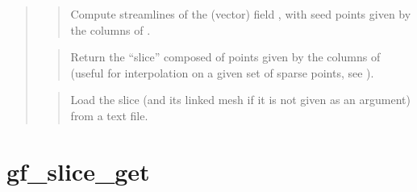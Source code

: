 \documentclass[a4paper,11pt,english]{sphinxmanual}
\begin{document}
\begin{quote}
\begin{quote}
Compute streamlines of the (vector) field , with seed points given
by the columns of .
\end{quote}

\begin{quote}

Return the “slice” composed of points given by the columns of 
(useful for interpolation on a given set of sparse points, see
).
\end{quote}

\begin{quote}

Load the slice (and its linked mesh if it is not given as an argument)
from a text file.
\end{quote}
\end{quote}


\section{gf\_slice\_get}
\label{\detokenize{matlab_octave/cmdref_gf_slice_get:gf-slice-get}}\label{\detokenize{matlab_octave/cmdref_gf_slice_get::doc}}
\end{document}
